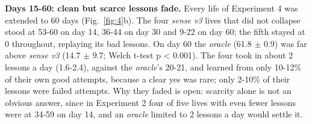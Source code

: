 \textbf{Days 15-60: clean but scarce lessons fade.} Every life of Experiment 4 was extended to 60 days (Fig.~\ref{fig:4}b). The four \emph{sense v3} lives that did not collapse stood at 53-60 on day 14, 36-44 on day 30 and 9-22 on day 60; the fifth stayed at 0 throughout, replaying its bad lessons. On day 60 the \emph{oracle} (61.8 $\pm$ 0.9) was far above \emph{sense v3} (14.7 $\pm$ 9.7; Welch t-test p \textless{} 0.001). The four took in about 2 lessons a day (1.6-2.4), against the \emph{oracle}'s 20-21, and learned from only 10-12\% of their own good attempts, because a clear yes was rare; only 2-10\% of their lessons were failed attempts. Why they faded is open: scarcity alone is not an obvious answer, since in Experiment 2 four of five lives with even fewer lessons were at 34-59 on day 14, and an \emph{oracle} limited to 2 lessons a day would settle it.
